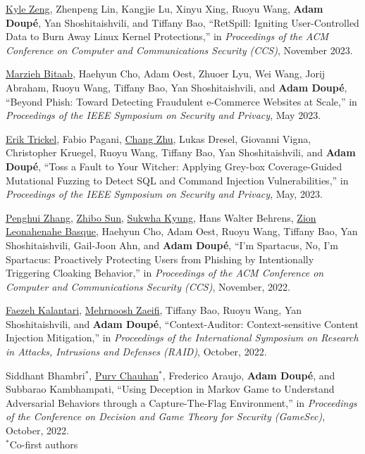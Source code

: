 \documentclass[11pt,letterpaper,sans]{moderncv}
\begin{document}
\begin{etaremune}

\item \underline{Kyle Zeng}, Zhenpeng Lin, Kangjie Lu, Xinyu Xing, Ruoyu Wang, \textbf{Adam Doup\'e}, Yan Shoshitaishvili, and Tiffany Bao, ``RetSpill: Igniting User-Controlled Data to Burn Away Linux Kernel Protections,'' in \emph{Proceedings of the ACM Conference on Computer and Communications Security (CCS)}, November 2023.
  
\item \underline{Marzieh Bitaab}, Haehyun Cho, Adam Oest, Zhuoer Lyu,  Wei Wang, Jorij Abraham,  Ruoyu Wang, Tiffany Bao,  Yan Shoshitaishvili, and \textbf{Adam Doup\'e}, ``Beyond Phish: Toward Detecting Fraudulent e-Commerce Websites at Scale,'' in \emph{Proceedings of the IEEE Symposium on Security and Privacy}, May 2023.

\item \underline{Erik Trickel},  Fabio Pagani, \underline{Chang Zhu}, Lukas Dresel,  Giovanni Vigna,  Christopher Kruegel, Ruoyu Wang,  Tiffany Bao,  Yan Shoshitaishvili, and  \textbf{Adam Doup\'e}, ``Toss a Fault to Your Witcher: Applying Grey-box Coverage-Guided Mutational Fuzzing to Detect SQL and Command Injection Vulnerabilities,'' in \emph{Proceedings of the IEEE Symposium on Security and Privacy}, May, 2023.

\item \underline{Penghui Zhang},  \underline{Zhibo Sun}, \underline{Sukwha Kyung},  Hans Walter Behrens,  \underline{Zion Leonahenahe Basque}, Haehyun Cho,  Adam Oest,  Ruoyu Wang,  Tiffany Bao,  Yan Shoshitaishvili,  Gail-Joon Ahn, and \textbf{Adam Doup\'e}, ``I'm Spartacus, No, I'm Spartacus: Proactively Protecting Users from Phishing by Intentionally Triggering Cloaking Behavior,'' in \emph{Proceedings of the ACM Conference on Computer and Communications Security (CCS)}, November, 2022.

\item \underline{Faezeh Kalantari}, \underline{Mehrnoosh Zaeifi},  Tiffany Bao,  Ruoyu Wang,  Yan Shoshitaishvili, and  \textbf{Adam Doup\'e}, ``Context-Auditor: Context-sensitive Content Injection Mitigation,'' in \emph{Proceedings of the International Symposium on Research in Attacks, Intrusions and Defenses (RAID)}, October, 2022.
  
\item Siddhant Bhambri$^*$,  \underline{Purv Chauhan}$^*$,  Frederico Araujo,  \textbf{Adam Doup\'e}, and  Subbarao Kambhampati, ``Using Deception in Markov Game to Understand Adversarial Behaviors through a Capture-The-Flag Environment,'' in \emph{Proceedings of the Conference on Decision and Game Theory for Security (GameSec)}, October, 2022. \\
  $^*$Co-first authors
  

\end{etaremune}
\end{document}
